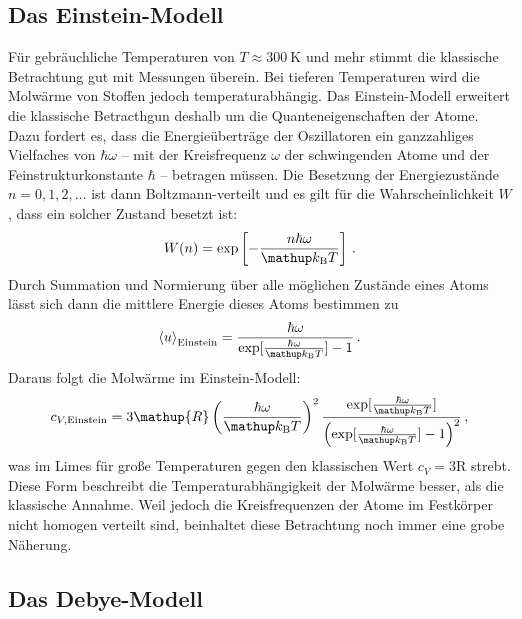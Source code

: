 \subsection{Das Einstein-Modell}
\label{subsec:einstein}
Für gebräuchliche Temperaturen von $T \approx \SI{300}{\kelvin}$ und mehr
stimmt die klassische Betrachtung gut mit Messungen überein.
Bei tieferen Temperaturen wird die Molwärme von Stoffen jedoch
temperaturabhängig.
Das Einstein-Modell erweitert die klassische Betracthgun deshalb um die
Quanteneigenschaften der Atome. Dazu fordert es, dass die Energieüberträge
der Oszillatoren ein ganzzahliges Vielfaches von $\hbar\omega$ -- mit
der Kreisfrequenz $\omega$ der schwingenden Atome und der
Feinstrukturkonstante $\hbar$ -- betragen müssen.
Die Besetzung der Energiezustände $n = 0,1,2,\dots$ ist dann Boltzmann-verteilt
und es gilt für die Wahrscheinlichkeit $W$, dass ein solcher Zustand besetzt
ist:
\begin{equation}
    \label{eqn:boltzmann}
    W(n) = \exp\left[-\frac{n\hbar\omega}{\kb T}\right]\,.
\end{equation}
Durch Summation und Normierung über alle möglichen Zustände eines Atoms
lässt sich dann die mittlere Energie dieses Atoms bestimmen zu
\begin{equation}
    \label{eqn:u_einstein}
    \left<u\right>_\text{Einstein} =
    \frac{\hbar\omega}{\exp[\frac{\hbar\omega}{\kb T}] - 1}\,.
\end{equation}
Daraus folgt die Molwärme im Einstein-Modell:
\begin{equation}
    \label{eqn:cv_einstein}
    c_{V,\text{Einstein}} =
    3\mathup{R}\left(\frac{\hbar\omega}{\kb T}\right)^2
    \frac{
        \exp[\frac{\hbar\omega}{\kb T}]
    }{
        \left(\exp[\frac{\hbar\omega}{\kb T}] - 1\right)^2
    }\,,
\end{equation}
was im Limes für große Temperaturen gegen den klassischen Wert
$c_V = 3\mathup{R}$ strebt.
Diese Form beschreibt die Temperaturabhängigkeit der Molwärme besser, als
die klassische Annahme. Weil jedoch die Kreisfrequenzen der Atome im Festkörper
nicht homogen verteilt sind, beinhaltet diese Betrachtung noch immer eine grobe
Näherung.

\subsection{Das Debye-Modell}
\label{subsec:debye}
